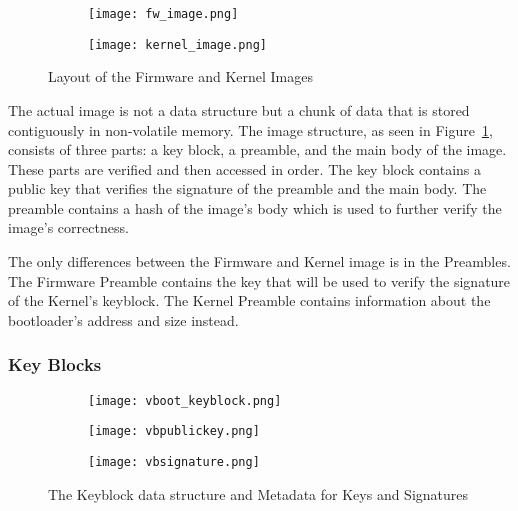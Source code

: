 \documentclass[../report.tex]{subfiles}
\begin{document}
\begin{figure}
\begin{subfigure}{.5\textwidth}
  \centering
  \texttt{[image: fw\_image.png]}
\end{subfigure}%
\begin{subfigure}{.5\textwidth}
  \centering
  \texttt{[image: kernel\_image.png]}
\end{subfigure}
\caption{Layout of the Firmware and Kernel Images~\cite{vboot-data-structures}}
\label{fig:vboot_images}
\end{figure}

The actual image is not a data structure but a chunk of data that is stored contiguously in non-volatile memory.
The image structure, as seen in Figure~\ref{fig:vboot_images}, consists of three parts: a key block, a preamble, and the main body of the image.
These parts are verified and then accessed in order.
The key block contains a public key that verifies the signature of the preamble and the main body. 
The preamble contains a hash of the image's body which is used to further verify the image's correctness.

The only differences between the Firmware and Kernel image is in the Preambles.
The Firmware Preamble contains the key that will be used to verify the signature of the Kernel's keyblock.
The Kernel Preamble contains information about the bootloader's address and size instead.

\subsubsection{Key Blocks}

\begin{figure}
\begin{subfigure}{.5\textwidth}
  \centering
  \texttt{[image: vboot\_keyblock.png]}
\end{subfigure}
\begin{subfigure}{.20\textwidth}
  \centering
  \texttt{[image: vbpublickey.png]}
\end{subfigure}
\begin{subfigure}{.20\textwidth}
  \centering
  \texttt{[image: vbsignature.png]}
\end{subfigure}
\caption{The Keyblock data structure and Metadata for Keys and Signatures}
\label{fig:vboot_keyblock}
\end{figure}
\end{document}
